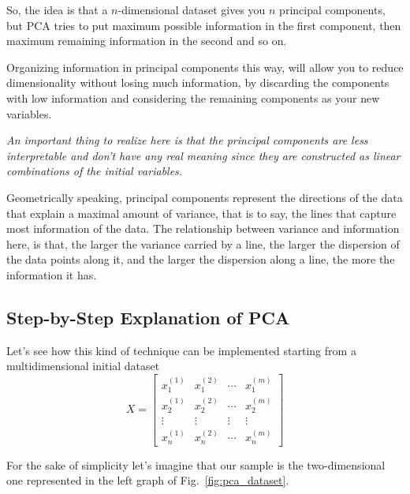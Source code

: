 So, the idea is that a $n$-dimensional dataset gives you $n$ principal components, but PCA tries to put maximum possible information in the first component, then maximum remaining information in the second and so on.

Organizing information in principal components this way, will allow you to reduce dimensionality without losing much information, by discarding the components with low information and considering the remaining components as your new variables.

\emph{An important thing to realize here is that the principal components are less interpretable and don’t have any real meaning since they are constructed as linear combinations of the initial variables.}

Geometrically speaking, principal components represent the directions of the data that explain a maximal amount of variance, that is to say, the lines that capture most information of the data. The relationship between variance and information here, is that, the larger the variance carried by a line, the larger the dispersion of the data points along it, and the larger the dispersion along a line, the more the information it has.

\subsection{Step-by-Step Explanation of PCA}

Let's see how this kind of technique can be implemented starting from a multidimensional initial dataset 
\begin{equation}
	X=\begin{bmatrix}
		x^{(1)}_1 &x^{(2)}_1&\cdots &x^{(m)}_1 \\
		x^{(1)}_2 &x^{(2)}_2&\cdots &x^{(m)}_2 \\
		\vdots &\vdots &\vdots &\vdots \\
		x^{(1)}_n &x^{(2)}_n&\cdots &x^{(m)}_n 
	\end{bmatrix}
\end{equation}

For the sake of simplicity let's imagine that our sample is the two-dimensional one represented in the left graph of Fig.~\ref{fig:pca_dataset}.

